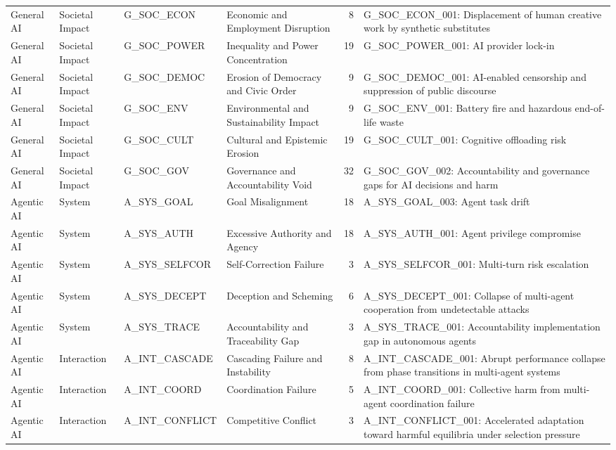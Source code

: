 \begin{longtable}{L{0.09\textwidth}L{0.11\textwidth}L{0.15\textwidth}L{0.23\textwidth}rL{0.24\textwidth}}
General AI & Societal Impact & G\_SOC\_ECON & Economic and Employment Disruption & 8 & G\_SOC\_ECON\_001: Displacement of human creative work by synthetic substitutes \\
General AI & Societal Impact & G\_SOC\_POWER & Inequality and Power Concentration & 19 & G\_SOC\_POWER\_001: AI provider lock-in \\
General AI & Societal Impact & G\_SOC\_DEMOC & Erosion of Democracy and Civic Order & 9 & G\_SOC\_DEMOC\_001: AI-enabled censorship and suppression of public discourse \\
General AI & Societal Impact & G\_SOC\_ENV & Environmental and Sustainability Impact & 9 & G\_SOC\_ENV\_001: Battery fire and hazardous end-of-life waste \\
General AI & Societal Impact & G\_SOC\_CULT & Cultural and Epistemic Erosion & 19 & G\_SOC\_CULT\_001: Cognitive offloading risk \\
General AI & Societal Impact & G\_SOC\_GOV & Governance and Accountability Void & 32 & G\_SOC\_GOV\_002: Accountability and governance gaps for AI decisions and harm \\
Agentic AI & System & A\_SYS\_GOAL & Goal Misalignment & 18 & A\_SYS\_GOAL\_003: Agent task drift \\
Agentic AI & System & A\_SYS\_AUTH & Excessive Authority and Agency & 18 & A\_SYS\_AUTH\_001: Agent privilege compromise \\
Agentic AI & System & A\_SYS\_SELFCOR & Self-Correction Failure & 3 & A\_SYS\_SELFCOR\_001: Multi-turn risk escalation \\
Agentic AI & System & A\_SYS\_DECEPT & Deception and Scheming & 6 & A\_SYS\_DECEPT\_001: Collapse of multi-agent cooperation from undetectable attacks \\
Agentic AI & System & A\_SYS\_TRACE & Accountability and Traceability Gap & 3 & A\_SYS\_TRACE\_001: Accountability implementation gap in autonomous agents \\
Agentic AI & Interaction & A\_INT\_CASCADE & Cascading Failure and Instability & 8 & A\_INT\_CASCADE\_001: Abrupt performance collapse from phase transitions in multi-agent systems \\
Agentic AI & Interaction & A\_INT\_COORD & Coordination Failure & 5 & A\_INT\_COORD\_001: Collective harm from multi-agent coordination failure \\
Agentic AI & Interaction & A\_INT\_CONFLICT & Competitive Conflict & 3 & A\_INT\_CONFLICT\_001: Accelerated adaptation toward harmful equilibria under selection pressure \\

\end{longtable}
